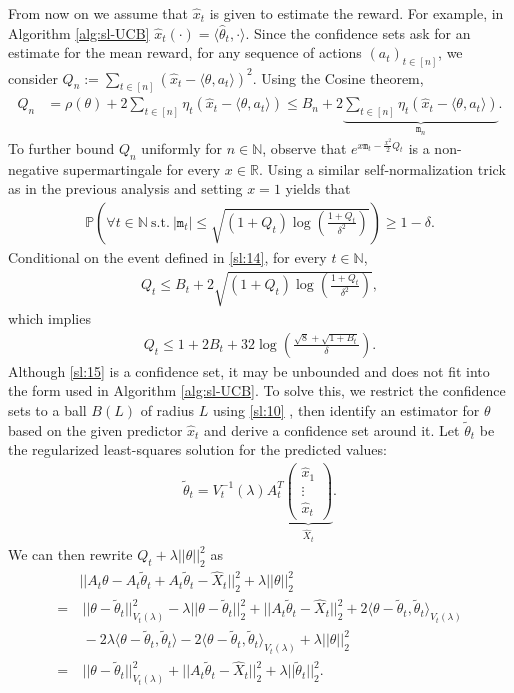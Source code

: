 \documentclass[letterpaper,11pt,openright,openany]{book}
\numberwithin{equation}{section}
\theoremstyle{plain}
\theoremstyle{definition}
\def\R{{\mathbb R}}
\def\N{{\mathbb N}}
\def\R{{\mathbb R}}
\def\P{{\mathbb P}}
\def\t{{\theta}}
\begin{document}
From now on we assume that $\hat{x}_t$ is given to estimate the reward. For example, in Algorithm \ref{alg:sl-UCB} $\hat{x}_t (\cdot)= \langle\hat{\t}_t, \cdot\rangle$. Since the confidence sets ask for an estimate for the mean reward, for any sequence of actions $(a_t)_{t\in [n]}$, we consider $Q_n := \sum_{t\in [n]}(\hat{x}_t-\langle\t, a_t\rangle)^2$. Using the Cosine theorem,  
\begin{align*}
Q_n&=\rho(\t)+2\sum_{t\in [n]}\eta_t(\hat{x}_t-\langle\t, a_t\rangle)\leq B_n+2\underbrace{\sum_{t\in [n]}\eta_t(\hat{x}_t-\langle\t, a_t\rangle)}_{\texttt{m}_n}.
\end{align*}
To further bound $Q_n$ uniformly for $n\in\N$, observe that $e^{x\texttt{m}_t-\frac{x^2}{2}Q_t}$ is a non-negative supermartingale for every $x\in\R$. Using a similar self-normalization trick as in the previous analysis and setting $x = 1$ yields that 
\begin{align}
\P\left(\forall t\in\N \ \text{s.t.}\  |\texttt{m}_t|\leq\sqrt{(1+Q_t)\log\left(\frac{1+Q_t}{\delta^2}\right)} \right)\geq 1-\delta. \label{sl:14}
\end{align}
Conditional on the event defined in \eqref{sl:14}, for every $t\in\N$, 
\begin{align*}
Q_t\leq B_t + 2\sqrt{(1+Q_t)\log\left(\frac{1+Q_t}{\delta^2}\right)},
\end{align*}
which implies
\begin{align}
Q_t\leq 1+2B_t+32\log\left(\frac{\sqrt{8}+\sqrt{1+B_t}}{\delta}\right).\label{sl:15}
\end{align}
Although \eqref{sl:15} is a confidence set, it may be unbounded and does not fit into the form used in Algorithm \ref{alg:sl-UCB}. To solve this, we restrict the confidence sets to a ball $B(L)$ of radius $L$ using \eqref{sl:10} , then identify an estimator for $\t$ based on the given predictor $\hat{x}_t$ and derive a confidence set around it. Let $\tilde{\t}_t$ be the regularized least-squares solution for the predicted values:
\begin{align*}
\tilde{\t}_t = V_t^{-1}(\lambda)A_t^T\underbrace{\begin{pmatrix}
\hat{x}_1\\
\vdots\\
\hat{x}_t
\end{pmatrix}}_{\hat{X}_t}.
\end{align*}
We can then rewrite $Q_t+\lambda ||\t||_2^2$ as 
\begin{align*}
&||A_t\t-A_t\tilde{\t}_t+A_t\tilde{\t}_t-\hat{X}_t||_2^2 + \lambda ||\t||_2^2\\
=&\  ||\t-\tilde\t_t||^2_{V_t(\lambda)} -\lambda ||\t-\tilde\t_t||_2^2 + ||A_t\tilde{\t}_t-\hat{X}_t||_2^2+2\langle\t-\tilde\t_t, \tilde\t_t\rangle_{V_t(\lambda)}\\
&\ -2\lambda \langle \t-\tilde \t_t, \tilde\t_t\rangle-2\langle\t-\tilde\t_t, \tilde\t_t\rangle_{V_t(\lambda)}+\lambda ||\t||_2^2\\
=&\ ||\t-\tilde\t_t||^2_{V_t(\lambda)}+ ||A_t\tilde{\t}_t-\hat{X}_t||_2^2+\lambda ||\tilde\t_t||_2^2.
\end{align*} 
\end{document}
